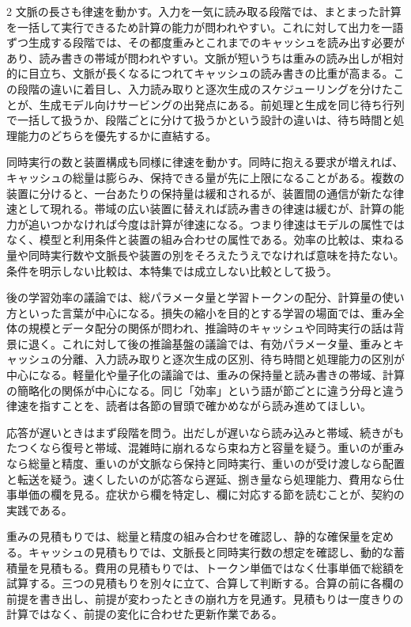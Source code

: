 \documentclass[lualatex,a4paper,10pt]{jlreq}
\begin{document}
\begin{multicols}{2}
文脈の長さも律速を動かす。入力を一気に読み取る段階では、まとまった計算を一括して実行できるため計算の能力が問われやすい。これに対して出力を一語ずつ生成する段階では、その都度重みとこれまでのキャッシュを読み出す必要があり、読み書きの帯域が問われやすい。文脈が短いうちは重みの読み出しが相対的に目立ち、文脈が長くなるにつれてキャッシュの読み書きの比重が高まる。この段階の違いに着目し、入力読み取りと逐次生成のスケジューリングを分けたことが、生成モデル向けサービングの出発点にある\autocite{orca}。前処理と生成を同じ待ち行列で一括して扱うか、段階ごとに分けて扱うかという設計の違いは、待ち時間と処理能力のどちらを優先するかに直結する。

同時実行の数と装置構成も同様に律速を動かす。同時に抱える要求が増えれば、キャッシュの総量は膨らみ、保持できる量が先に上限になることがある。複数の装置に分けると、一台あたりの保持量は緩和されるが、装置間の通信が新たな律速として現れる。帯域の広い装置に替えれば読み書きの律速は緩むが、計算の能力が追いつかなければ今度は計算が律速になる。つまり律速はモデルの属性ではなく、模型と利用条件と装置の組み合わせの属性である。効率の比較は、束ねる量や同時実行数や文脈長や装置の別をそろえたうえでなければ意味を持たない。条件を明示しない比較は、本特集では成立しない比較として扱う。

後の学習効率の議論では、総パラメータ量と学習トークンの配分、計算量の使い方といった言葉が中心になる。損失の縮小を目的とする学習の場面では、重み全体の規模とデータ配分の関係が問われ、推論時のキャッシュや同時実行の話は背景に退く。これに対して後の推論基盤の議論では、有効パラメータ量、重みとキャッシュの分離、入力読み取りと逐次生成の区別、待ち時間と処理能力の区別が中心になる。軽量化や量子化の議論では、重みの保持量と読み書きの帯域、計算の簡略化の関係が中心になる。同じ「効率」という語が節ごとに違う分母と違う律速を指すことを、読者は各節の冒頭で確かめながら読み進めてほしい。

\begin{themeoverview}[律速の見分け方]
応答が遅いときはまず段階を問う。出だしが遅いなら読み込みと帯域、続きがもたつくなら復号と帯域、混雑時に崩れるなら束ね方と容量を疑う。重いのが重みなら総量と精度、重いのが文脈なら保持と同時実行、重いのが受け渡しなら配置と転送を疑う。速くしたいのが応答なら遅延、捌き量なら処理能力、費用なら仕事単価の欄を見る。症状から欄を特定し、欄に対応する節を読むことが、契約の実践である。
\end{themeoverview}

\begin{themeoverview}[見積もりの順序]
重みの見積もりでは、総量と精度の組み合わせを確認し、静的な確保量を定める。キャッシュの見積もりでは、文脈長と同時実行数の想定を確認し、動的な蓄積量を見積もる。費用の見積もりでは、トークン単価ではなく仕事単価で総額を試算する。三つの見積もりを別々に立て、合算して判断する。合算の前に各欄の前提を書き出し、前提が変わったときの崩れ方を見通す。見積もりは一度きりの計算ではなく、前提の変化に合わせた更新作業である。
\end{themeoverview}


\end{multicols}
\end{document}
